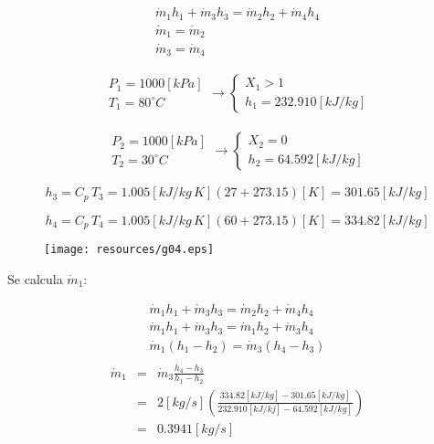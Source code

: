 \documentclass[letter,10pt]{article}
\begin{document}
\begin{enumerate}
\begin{eqnarray*}
    \dot{m}_1 h_1 + \dot{m}_3 h_3 = \dot{m}_2 h_2 + \dot{m}_4 h_4 \\
    \dot{m}_1 = \dot{m}_2 \\
    \dot{m}_3 = \dot{m}_4
\end{eqnarray*}

\begin{eqnarray*}
    \begin{array}{c}
        P_1 = 1000[kPa] \\
        T_1 = 80^\circ C
    \end{array}
    \rightarrow
    \begin{cases}
        X_1 > 1 \\
        h_1 = 232.910[kJ/kg]
    \end{cases}
\end{eqnarray*}

\begin{eqnarray*}
    \begin{array}{c}
        P_2 = 1000[kPa] \\
        T_2 = 30^\circ C
    \end{array}
    \rightarrow
    \begin{cases}
        X_2 = 0 \\
        h_2 = 64.592[kJ/kg]
    \end{cases}
\end{eqnarray*}

\begin{equation*}
    h_3 = C_p\,T_3 = 1.005[kJ/kg\,K] (27 + 273.15)[K] = 301.65[kJ/kg]
\end{equation*}

\begin{equation*}
    h_4 = C_p\,T_4 = 1.005[kJ/kg\,K] (60 + 273.15)[K] = 334.82[kJ/kg]
\end{equation*}

\begin{figure}[H]
\centering
\texttt{[image: resources/g04.eps]}
\end{figure}

Se calcula $\dot{m}_1$:

\begin{eqnarray*}
    \dot{m}_1 h_1 + \dot{m}_3 h_3 = \dot{m}_2 h_2 + \dot{m}_4 h_4 \\
    \dot{m}_1 h_1 + \dot{m}_3 h_3 = \dot{m}_1 h_2 + \dot{m}_3 h_4 \\
    \dot{m}_1 (h_1 - h_2) = \dot{m}_3 (h_4 - h_3) \\
\end{eqnarray*}
\begin{eqnarray*}
    \dot{m}_1 &=& \dot{m}_3\frac{h_4 - h_3}{h_1 - h_2} \\
              &=& 2[kg/s]\left(\frac{334.82[kJ/kg]-301.65[kJ/kg]}{232.910[kJ/kj]
                - 64.592[kJ/kg]}\right) \\
              &=& 0.3941[kg/s]
\end{eqnarray*}


\end{enumerate}
\end{document}
